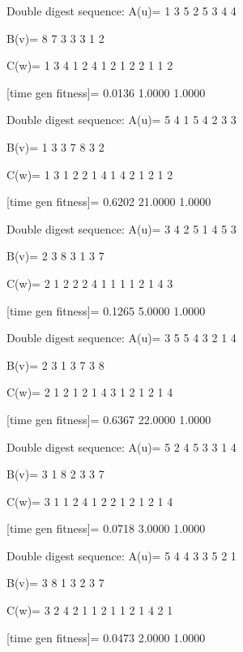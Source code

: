 Double digest sequence:
A(u)=
     1     3     5     2     5     3     4     4

B(v)=
     8     7     3     3     3     1     2

C(w)=
     1     3     4     1     2     4     1     2     1     2     2     1     1     2

[time gen fitness]=
    0.0136    1.0000    1.0000

Double digest sequence:
A(u)=
     5     4     1     5     4     2     3     3

B(v)=
     1     3     3     7     8     3     2

C(w)=
     1     3     1     2     2     1     4     1     4     2     1     2     1     2

[time gen fitness]=
    0.6202   21.0000    1.0000

Double digest sequence:
A(u)=
     3     4     2     5     1     4     5     3

B(v)=
     2     3     8     3     1     3     7

C(w)=
     2     1     2     2     2     4     1     1     1     1     2     1     4     3

[time gen fitness]=
    0.1265    5.0000    1.0000

Double digest sequence:
A(u)=
     3     5     5     4     3     2     1     4

B(v)=
     2     3     1     3     7     3     8

C(w)=
     2     1     2     1     2     1     4     3     1     2     1     2     1     4

[time gen fitness]=
    0.6367   22.0000    1.0000

Double digest sequence:
A(u)=
     5     2     4     5     3     3     1     4

B(v)=
     3     1     8     2     3     3     7

C(w)=
     3     1     1     2     4     1     2     2     1     2     1     2     1     4

[time gen fitness]=
    0.0718    3.0000    1.0000

Double digest sequence:
A(u)=
     5     4     4     3     3     5     2     1

B(v)=
     3     8     1     3     2     3     7

C(w)=
     3     2     4     2     1     1     2     1     1     2     1     4     2     1

[time gen fitness]=
    0.0473    2.0000    1.0000

